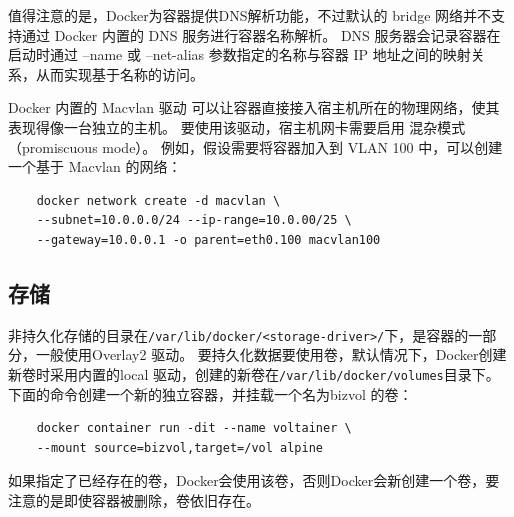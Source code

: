 值得注意的是，Docker为容器提供DNS解析功能，不过默认的 bridge 网络并不支持通过 Docker 内置的 DNS 服务进行容器名称解析。
DNS 服务器会记录容器在启动时通过 --name 或 --net-alias 参数指定的名称与容器 IP 地址之间的映射关系，从而实现基于名称的访问。

Docker 内置的 Macvlan 驱动 可以让容器直接接入宿主机所在的物理网络，使其表现得像一台独立的主机。
要使用该驱动，宿主机网卡需要启用 混杂模式（promiscuous mode）。
例如，假设需要将容器加入到 VLAN 100 中，可以创建一个基于 Macvlan 的网络：
\begin{verbatim}
	docker network create -d macvlan \
	--subnet=10.0.0.0/24 --ip-range=10.0.00/25 \
	--gateway=10.0.0.1 -o parent=eth0.100 macvlan100
\end{verbatim}

\subsection{存储}
非持久化存储的目录在\verb|/var/lib/docker/<storage-driver>/|下，是容器的一部分，一般使用Overlay2 驱动。
要持久化数据要使用卷，默认情况下，Docker创建新卷时采用内置的local 驱动，创建的新卷在\verb|/var/lib/docker/volumes|目录下。
下面的命令创建一个新的独立容器，并挂载一个名为bizvol 的卷：
\begin{verbatim}
	docker container run -dit --name voltainer \
	--mount source=bizvol,target=/vol alpine
\end{verbatim}
如果指定了已经存在的卷，Docker会使用该卷，否则Docker会新创建一个卷，要注意的是即使容器被删除，卷依旧存在。


